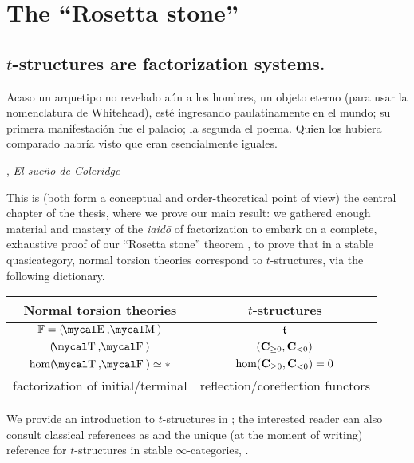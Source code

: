\chapter{The ``Rosetta stone''}\label{chap:tstruct}
\thispagestyle{empty}
\section{\texorpdfstring{$t$}{t}-structures are factorization systems.}
\setlength{\epigraphwidth}{.75\textwidth}
\epigraph{Acaso un arquetipo no revelado a\'un a los hombres, un objeto eterno (para usar la nomenclatura de Whitehead), est\'e ingresando paulatinamente en el mundo; su primera manifestaci\'on fue el palacio; la segunda el poema. Quien los hubiera comparado habr\'ia visto que eran esencialmente iguales.}{\cite{borges1997otras}, \emph{El sue\~no de Coleridge}}
\setlength{\epigraphwidth}{\DefaultEpigraphWidth}
This is (both form a conceptual and order\hyp{}theoretical point of view) the central chapter of the thesis, where we prove our main result: we gathered enough material and mastery of the \emph{iaid\=o} of factorization to embark on a complete, exhaustive proof of our ``Rosetta stone'' theorem , \ie to prove that in a stable quasicategory, normal torsion theories correspond to $t$\hyp{}structures, via the following dictionary.
\begin{center}
\begin{tabular}{|c|c|}\hline
\textbf{Normal torsion theories} & \textbf{$t$\hyp{}structures} \\ \hline \hline
$\fF=(\EE,\MM)$ & $\mathfrak{t}$ \\ \hline
$(\TT,\F)$ & $(\textbf{C}_{\ge 0}, \textbf{C}_{<0})$ \\ \hline
$\hom(\TT,\F)\simeq * $ & $\text{hom}(\textbf{C}_{\ge 0},\textbf{C}_{<0})=0$ \\ \hline
factorization of initial\fshyp{}terminal & reflection\fshyp{}coreflection functors \\ \hline
\end{tabular}
\end{center}
We provide an introduction to $t$\hyp{}structures in ; the interested reader can also consult classical references as \cite{Kashiwara,BBDPervers} and the unique (at the moment of writing) reference for $t$\hyp{}structures in stable $\infty$\hyp{}categories, \cite{LurieHA}.

